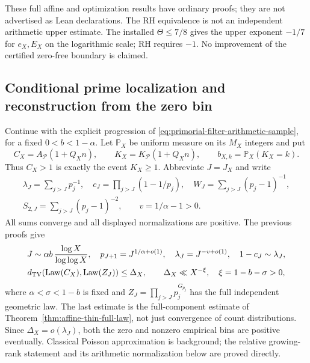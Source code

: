 \documentclass[11pt]{article}
\theoremstyle{definition}
\begin{document}
These full affine and optimization results have ordinary proofs;
they are not advertised as Lean declarations.
The RH equivalence is not an independent arithmetic upper estimate.
The installed $\Theta\le7/8$ gives the upper exponent $-1/7$
for $e_X,E_X$ on the logarithmic scale; RH requires $-1$.
No improvement of the certified zero-free boundary is claimed.

\subsection{Conditional prime localization and reconstruction from the zero bin}
\label{sec:conditional-thin-prime-reconstruction}

Continue with the explicit progression of
\eqref{eq:primorial-filter-arithmetic-sample}, for a fixed
$0<b<1-\alpha$.
Let $\mathbb P_X$ be uniform measure on its $M_X$ integers and put
\[
 C_X=A_{\mathcal P}(1+Q_Xn),\qquad
 K_X=K_{\mathcal P}(1+Q_Xn),\qquad
 b_{X,k}=\mathbb P_X(K_X=k).
\]
Thus $C_X>1$ is exactly the event $K_X\ge1$.
Abbreviate $J=J_X$ and write
\begin{equation}
 \begin{gathered}
 \lambda_J=\sum_{j>J}p_j^{-1},\quad
 c_J=\prod_{j>J}(1-1/p_j),\quad
 W_J=\sum_{j>J}(p_j-1)^{-1},\\
 S_{2,J}=\sum_{j>J}(p_j-1)^{-2},\qquad
 v=1/\alpha-1>0 .
 \end{gathered}
 \label{eq:conditional-thin-parameters}
\end{equation}
All sums converge and all displayed normalizations are positive.
The previous proofs give
\begin{equation}
 \begin{gathered}
 J\sim\alpha b\,\frac{\log X}{\log\log X},\quad
 p_{J+1}=J^{1/\alpha+o(1)},\quad
 \lambda_J=J^{-v+o(1)},\quad
 1-c_J\sim\lambda_J,\\
 d_{\rm TV}(\operatorname{Law}(C_X),
       \operatorname{Law}(Z_J))\le\Delta_X,\qquad
 \Delta_X\ll X^{-\xi},\quad \xi=1-b-\sigma>0,
 \end{gathered}
 \label{eq:conditional-thin-model-budget}
\end{equation}
where $\alpha<\sigma<1-b$ is fixed and
$Z_J=\prod_{j>J}p_j^{G_{p_j}}$ has the full independent
geometric law.  The last estimate is the full-component estimate
of Theorem~\ref{thm:affine-thin-full-law}, not just convergence
of count distributions.  Since $\Delta_X=o(\lambda_J)$,
both the zero and nonzero empirical bins are positive eventually.
Classical Poisson approximation is background; the relative
growing-rank statement and its arithmetic normalization below
are proved directly.
\end{document}
